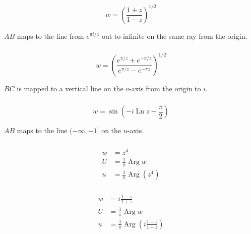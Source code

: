 \documentclass{article}
\newcommand{\Arg}{\operatorname{Arg}}
\newcommand{\Ln}{\operatorname{Ln}}
\begin{document}
        \[w = \left( \frac{1 + z}{1 - z} \right)^{1 / 2}\]

      $A B$ maps to the line from $e^{\pi i / 4}$ out to infinite on the same ray from the origin.

        \setcounter{subsubsection}{14}
        \subsubsection{}

        \[w = \left( \frac{e^{\pi / z} + e^{-\pi / z}}{e^{\pi / z} - e^{-\pi z}} \right)^{1 / 2}\]

      $B C$ is mapped to a vertical line on the $v$-axis from the origin to $i$.

        \setcounter{subsubsection}{16}
        \subsubsection{}

        \[w = \sin \left( -i \Ln z - \frac{\pi}{2} \right)\]

      $A B$ maps to the line $(-\infty, -1]$ on the $u$-axis.

\setcounter{subsubsection}{18}
\subsubsection{}

\begin{align*}
  w & = z^4                      \\
  U & = \frac{1}{\pi} \Arg w     \\
  u & = \frac{1}{\pi} \Arg (z^4)
\end{align*}

\setcounter{subsubsection}{20}
\subsubsection{}

\begin{align*}
  w & = i \frac{1 - z}{1 + z}                                   \\
  U & = \frac{1}{\pi} \Arg w                                    \\
  u & = \frac{1}{\pi} \Arg \left( i \frac{1 - z}{1 + z} \right)
\end{align*}

\setcounter{subsubsection}{22}
\subsubsection{}
\end{document}
